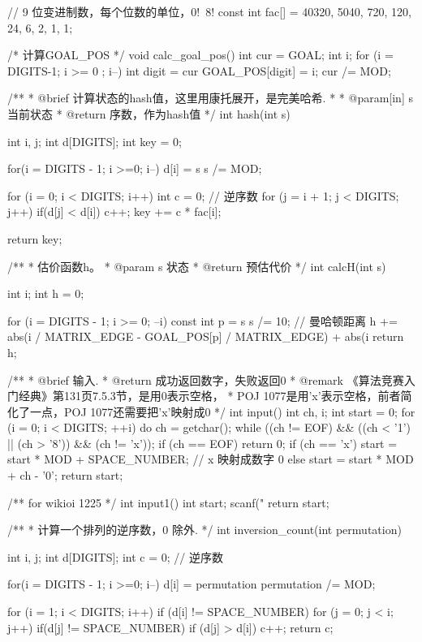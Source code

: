 \begin{Codex}[label=eight_digits_astar.c]
// 9 位变进制数，每个位数的单位，0!~8!
const int fac[] = {40320, 5040, 720, 120, 24, 6, 2, 1, 1};

/* 计算GOAL_POS */
void calc_goal_pos() {
    int cur = GOAL;
    int i;
    for (i = DIGITS-1; i >= 0 ; i--) {
        int digit = cur %
        GOAL_POS[digit] = i;
        cur /= MOD;
    }
}

/**
 * @brief 计算状态的hash值，这里用康托展开，是完美哈希.
 *
 * @param[in] s 当前状态
 * @return 序数，作为hash值
 */
int hash(int s) {
    int i, j;
    int d[DIGITS];
    int key = 0;

    for(i = DIGITS - 1; i >=0; i--) {
        d[i] = s %
        s /= MOD;
    }

    for (i = 0; i < DIGITS; i++) {
        int c = 0; // 逆序数
        for (j = i + 1; j < DIGITS; j++) {
            if(d[j] < d[i]) {
                c++;
            }
        }
        key += c * fac[i];
    }

    return key;
}


/**
 * 估价函数h。
 * @param s 状态
 * @return 预估代价
 */
int calcH(int s) {
    int i;
    int h = 0;

    for (i = DIGITS - 1; i >= 0; --i) {
        const int p = s %
        s /= 10;
        // 曼哈顿距离
        h += abs(i / MATRIX_EDGE - GOAL_POS[p] / MATRIX_EDGE) +
            abs(i %
    }
    return h;
}

/**
 * @brief 输入.
 * @return  成功返回数字，失败返回0
 * @remark 《算法竞赛入门经典》第131页7.5.3节，是用0表示空格，
 * POJ 1077是用'x'表示空格，前者简化了一点，POJ 1077还需要把'x'映射成0
 */
int input() {
    int ch, i;
    int start = 0;
    for (i = 0; i < DIGITS; ++i) {
        do {
            ch = getchar();
        } while ((ch != EOF) && ((ch < '1') || (ch > '8')) && (ch != 'x'));
        if (ch == EOF) return 0;
        if (ch == 'x') start = start * MOD + SPACE_NUMBER; // x 映射成数字 0
        else             start = start * MOD + ch - '0';
    }
    return start;
}

/** for wikioi 1225 */
int input1() {
    int start;
    scanf("%
    return start;
}

/**
 * 计算一个排列的逆序数，0 除外.
 */
int inversion_count(int permutation) {
    int i, j;
    int d[DIGITS];
    int c = 0; // 逆序数

    for(i = DIGITS - 1; i >=0; i--) {
        d[i] = permutation %
        permutation /= MOD;
    }

    for (i = 1; i < DIGITS; i++)  if (d[i] != SPACE_NUMBER) {
        for (j = 0; j < i; j++) {
            if(d[j] != SPACE_NUMBER) {
                if (d[j] > d[i]) {
                    c++;
                }
            }
        }
    }
    return c;
}


\end{Codex}

